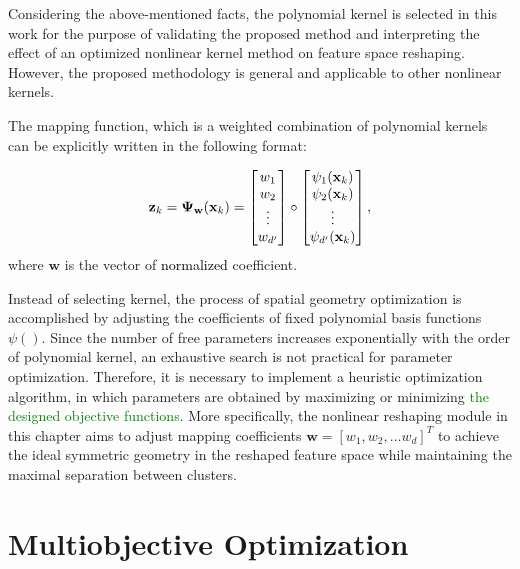 Considering the above-mentioned facts, the polynomial kernel is selected in this work for the purpose of validating the proposed method and interpreting the effect of an optimized nonlinear kernel method on feature space reshaping. However, the proposed methodology is general and applicable to other nonlinear kernels.

The mapping function, which is a weighted combination of polynomial kernels can be explicitly written in the following format:

\begin{align}
\mathbf{z}_k
=\mathbf{\Psi_{w}} (\mathbf{x}_k) = 
\begin{bmatrix}
w_{1}  \\
w_{2}   \\
\vdots \\
w_{d^\prime} 
\end{bmatrix}
\circ
\begin{bmatrix}
\psi_1(\mathbf{x}_k)\\
\psi_2(\mathbf{x}_k)\\
\vdots\\
\psi_{d^\prime}(\mathbf{x}_k)
\end{bmatrix} \color{black}{,}
\label{eq:z}
\end{align}
where $\mathbf{w}$ is the vector of \textcolor{black}{normalized} coefficient.%

Instead of selecting kernel, %
the process of spatial geometry optimization is accomplished by adjusting the coefficients of fixed polynomial basis functions $\psi()$. Since the number of free parameters increases exponentially with the order of polynomial kernel, an exhaustive search is not practical for parameter optimization. Therefore, it is necessary to implement a heuristic optimization algorithm, in which parameters are obtained by maximizing or minimizing \textcolor{green}{the designed objective functions}. More specifically, the nonlinear reshaping module in this chapter aims to adjust mapping coefficients  $\mathbf{w} = [w_1,w_2,\dots w_d]^T$ to achieve the ideal symmetric geometry in the reshaped feature space while maintaining the maximal separation between clusters.


\section{Multiobjective Optimization}

